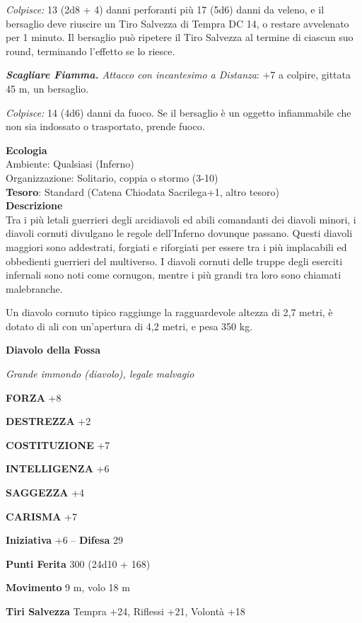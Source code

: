 \begin{multicols}{2}
	\textit{Colpisce:} 13 (2d8 + 4) danni perforanti più 17 (5d6) danni da veleno, e il bersaglio deve riuscire un Tiro Salvezza di Tempra DC 14, o restare avvelenato per 1 minuto. Il bersaglio può ripetere il Tiro Salvezza al termine di ciascun suo round, terminando l'effetto se lo
	riesce.

	\textit{\textbf{Scagliare Fiamma.} Attacco con incantesimo a Distanza}: +7 a colpire, gittata 45 m, un bersaglio.

	\textit{Colpisce:} 14 (4d6) danni da fuoco. Se il bersaglio è un oggetto infiammabile che non sia indossato o trasportato, prende fuoco.

	\textbf{Ecologia}\\
	Ambiente: Qualsiasi (Inferno)\\
	Organizzazione: Solitario, coppia o stormo (3-10)\\
	\textbf{Tesoro}: Standard (Catena Chiodata Sacrilega+1, altro tesoro)\\
	\textbf{Descrizione}\\
	Tra i più letali guerrieri degli arcidiavoli ed abili comandanti dei diavoli minori, i diavoli cornuti divulgano le regole dell'Inferno dovunque passano. Questi diavoli maggiori sono addestrati, forgiati e riforgiati per essere tra i più implacabili ed obbedienti guerrieri del multiverso. I diavoli cornuti delle truppe degli eserciti infernali sono noti come cornugon, mentre i più grandi tra loro sono chiamati malebranche.

	Un diavolo cornuto tipico raggiunge la ragguardevole altezza di 2,7 metri, è dotato di ali con un'apertura di 4,2 metri, e pesa 350 kg.


	\medskip{}\textbf{Diavolo della Fossa}\hypertarget{diavolodellafossa}{}

	\textit{Grande immondo (diavolo), legale malvagio}

	\textbf{FORZA} +8

	\textbf{DESTREZZA} +2

	\textbf{COSTITUZIONE} +7

	\textbf{INTELLIGENZA} +6

	\textbf{SAGGEZZA} +4

	\textbf{CARISMA} +7

	\textbf{Iniziativa} +6 -- \textbf{Difesa} 29

	\textbf{Punti Ferita} 300 (24d10 + 168)

	\textbf{Movimento} 9 m, volo 18 m

	\textbf{Tiri Salvezza} Tempra +24, Riflessi +21, Volontà +18


\end{multicols}
